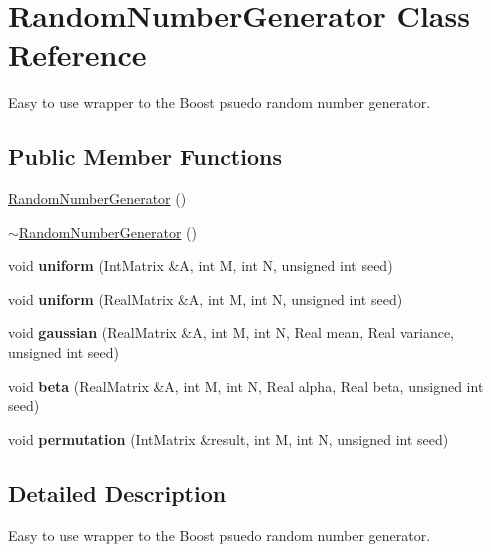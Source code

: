 \section{Random\+Number\+Generator Class Reference}
\label{classPecos_1_1RandomNumberGenerator}


Easy to use wrapper to the Boost psuedo random number generator.  


\subsection*{Public Member Functions}
\begin{DoxyCompactItemize}
\item 
\hyperlink{classPecos_1_1RandomNumberGenerator_a2b2ae87ef18bbb082edd3a5c4943bbda}{Random\+Number\+Generator} ()
\item 
\hyperlink{classPecos_1_1RandomNumberGenerator_ae2debb13cc14d8c0ac1b5b2b38f58918}{$\sim$\+Random\+Number\+Generator} ()
\item 
void {\bfseries uniform} (Int\+Matrix \&A, int M, int N, unsigned int seed)\label{classPecos_1_1RandomNumberGenerator_ad8bf1e8e0e14bae0f5a7ebfd0dffeaca}

\item 
void {\bfseries uniform} (Real\+Matrix \&A, int M, int N, unsigned int seed)\label{classPecos_1_1RandomNumberGenerator_abbb6ecbcb6624efe5ed213ee904cb6a4}

\item 
void {\bfseries gaussian} (Real\+Matrix \&A, int M, int N, Real mean, Real variance, unsigned int seed)\label{classPecos_1_1RandomNumberGenerator_a3c8d852097b1ffbe9b15fd6e844a67fc}

\item 
void {\bfseries beta} (Real\+Matrix \&A, int M, int N, Real alpha, Real beta, unsigned int seed)\label{classPecos_1_1RandomNumberGenerator_acf45f4b6e739602f38fa3db6aaa00abb}

\item 
void {\bfseries permutation} (Int\+Matrix \&result, int M, int N, unsigned int seed)\label{classPecos_1_1RandomNumberGenerator_a9b9fe162315eeb5f3cfd42988fb28dff}

\end{DoxyCompactItemize}


\subsection{Detailed Description}
Easy to use wrapper to the Boost psuedo random number generator. 

